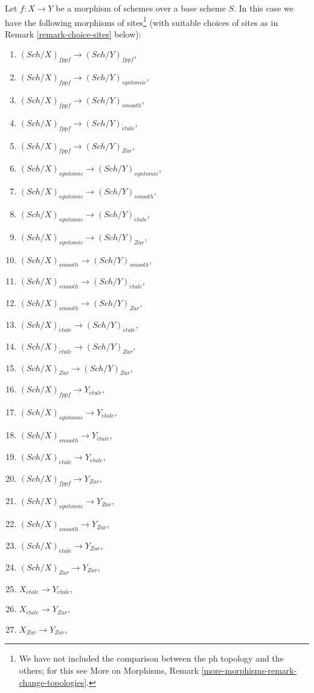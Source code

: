 \documentclass{stacks-project}
\theoremstyle{plain}
\theoremstyle{definition}
\theoremstyle{remark}
\numberwithin{equation}{subsection}
\def\Sch{\mathit{Sch}}
\def\etale{{\acute{e}tale}}
\begin{document}
\noindent
Let $f : X \to Y$ be a morphism of schemes over a base scheme $S$.
In this case we have the following morphisms of sites\footnote{We have
not included the comparison between the ph topology and the others;
for this see
More on Morphisms, Remark \ref{more-morphisms-remark-change-topologies}.}
(with suitable choices of sites as in Remark \ref{remark-choice-sites}
below):
\begin{enumerate}
\item $(\Sch/X)_{fppf} \longrightarrow (\Sch/Y)_{fppf}$,
\item $(\Sch/X)_{fppf} \longrightarrow (\Sch/Y)_{syntomic}$,
\item $(\Sch/X)_{fppf} \longrightarrow (\Sch/Y)_{smooth}$,
\item $(\Sch/X)_{fppf} \longrightarrow
(\Sch/Y)_\etale$,
\item $(\Sch/X)_{fppf} \longrightarrow (\Sch/Y)_{Zar}$,
\item $(\Sch/X)_{syntomic} \longrightarrow (\Sch/Y)_{syntomic}$,
\item $(\Sch/X)_{syntomic} \longrightarrow (\Sch/Y)_{smooth}$,
\item $(\Sch/X)_{syntomic} \longrightarrow
(\Sch/Y)_\etale$,
\item $(\Sch/X)_{syntomic} \longrightarrow (\Sch/Y)_{Zar}$,
\item $(\Sch/X)_{smooth} \longrightarrow (\Sch/Y)_{smooth}$,
\item $(\Sch/X)_{smooth} \longrightarrow
(\Sch/Y)_\etale$,
\item $(\Sch/X)_{smooth} \longrightarrow (\Sch/Y)_{Zar}$,
\item $(\Sch/X)_\etale \longrightarrow
(\Sch/Y)_\etale$,
\item $(\Sch/X)_\etale \longrightarrow (\Sch/Y)_{Zar}$,
\item $(\Sch/X)_{Zar} \longrightarrow (\Sch/Y)_{Zar}$,
\item $(\Sch/X)_{fppf} \longrightarrow Y_\etale$,
\item $(\Sch/X)_{syntomic} \longrightarrow Y_\etale$,
\item $(\Sch/X)_{smooth} \longrightarrow Y_\etale$,
\item $(\Sch/X)_\etale \longrightarrow Y_\etale$,
\item $(\Sch/X)_{fppf} \longrightarrow Y_{Zar}$,
\item $(\Sch/X)_{syntomic} \longrightarrow Y_{Zar}$,
\item $(\Sch/X)_{smooth} \longrightarrow Y_{Zar}$,
\item $(\Sch/X)_\etale \longrightarrow Y_{Zar}$,
\item $(\Sch/X)_{Zar} \longrightarrow Y_{Zar}$,
\item $X_\etale \longrightarrow Y_\etale$,
\item $X_\etale \longrightarrow Y_{Zar}$,
\item $X_{Zar} \longrightarrow Y_{Zar}$,
\end{enumerate}
\end{document}
